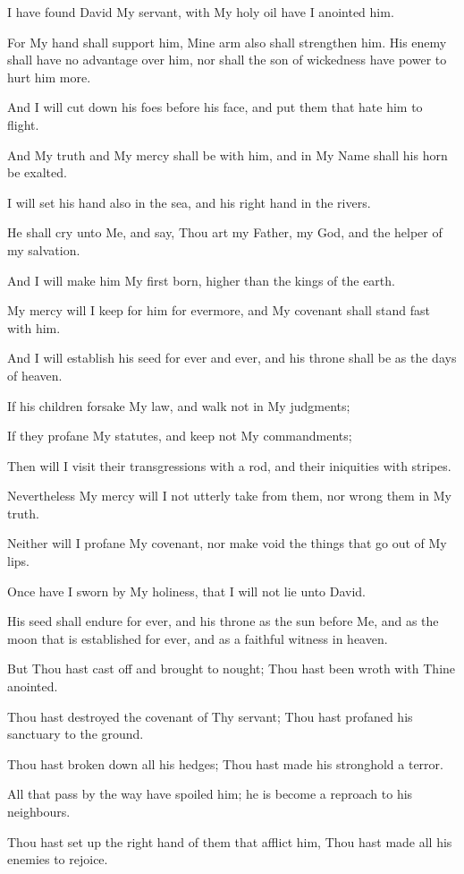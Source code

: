 I have found David My servant, with My holy oil have I anointed him.

For My hand shall support him, Mine arm also shall strengthen him. His enemy shall have no advantage over him, nor shall the son of wickedness have power to hurt him more.

And I will cut down his foes before his face, and put them that hate him to flight.

And My truth and My mercy shall be with him, and in My Name shall his horn be exalted.

I will set his hand also in the sea, and his right hand in the rivers.

He shall cry unto Me, and say, Thou art my Father, my God, and the helper of my salvation.

And I will make him My first born, higher than the kings of the earth.

My mercy will I keep for him for evermore, and My covenant shall stand fast with him.

And I will establish his seed for ever and ever, and his throne shall be as the days of heaven.

If his children forsake My law, and walk not in My judgments;

If they profane My statutes, and keep not My commandments;

Then will I visit their transgressions with a rod, and their iniquities with stripes.

Nevertheless My mercy will I not utterly take from them, nor wrong them in My truth.

Neither will I profane My covenant, nor make void the things that go out of My lips.

Once have I sworn by My holiness, that I will not lie unto David.

His seed shall endure for ever, and his throne as the sun before Me, and as the moon that is established for ever, and as a faithful witness in heaven.

But Thou hast cast off and brought to nought; Thou hast been wroth with Thine anointed.

Thou hast destroyed the covenant of Thy servant; Thou hast profaned his sanctuary to the ground.

Thou hast broken down all his hedges; Thou hast made his stronghold a terror.

All that pass by the way have spoiled him; he is become a reproach to his neighbours.

Thou hast set up the right hand of them that afflict him, Thou hast made all his enemies to rejoice.

